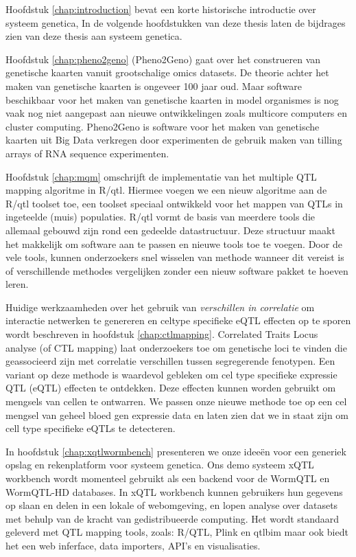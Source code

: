 Hoofdstuk \ref{chap:introduction} bevat een korte historische introductie over systeem genetica, 
In de volgende hoofdstukken van deze thesis laten de bijdrages zien van deze thesis aan systeem genetica.

Hoofdstuk \ref{chap:pheno2geno} (Pheno2Geno) gaat over het construeren van genetische kaarten vanuit grootschalige 
omics datasets. De theorie achter het maken van genetische kaarten is ongeveer 100 jaar oud. Maar 
software beschikbaar voor het maken van genetische kaarten in model organismes is nog 
vaak nog niet aangepast aan nieuwe ontwikkelingen zoals multicore computers en cluster computing. 
Pheno2Geno is software voor het maken van genetische kaarten uit Big Data verkregen door 
experimenten de gebruik maken van tilling arrays of RNA sequence experimenten.

Hoofdstuk \ref{chap:mqm} omschrijft de implementatie van het multiple QTL mapping algoritme 
in R/qtl. Hiermee voegen we een nieuw algoritme aan de R/qtl toolset toe, een 
toolset speciaal ontwikkeld voor het mappen van QTLs in ingeteelde (muis) populaties. R/qtl 
vormt de basis van meerdere tools die allemaal gebouwd zijn rond een gedeelde datastructuur. 
Deze structuur maakt het makkelijk om software aan te passen en nieuwe tools toe te voegen.
Door de vele tools, kunnen onderzoekers snel wisselen van methode wanneer dit vereist is of 
verschillende methodes vergelijken zonder een nieuw software pakket te hoeven leren.

Huidige werkzaamheden over het gebruik van \emph{verschillen in correlatie} om interactie 
netwerken te genereren en celtype specifieke eQTL effecten op te sporen wordt beschreven in 
hoofdstuk \ref{chap:ctlmapping}. Correlated Traits Locus analyse (of CTL mapping) laat 
onderzoekers toe om genetische loci te vinden die geassocieerd zijn met correlatie verschillen 
tussen segregerende fenotypen. Een variant op deze methode is waardevol gebleken om cel 
type specifieke expressie QTL (eQTL) effecten te ontdekken. Deze effecten kunnen worden 
gebruikt om mengsels van cellen te ontwarren. We passen onze nieuwe methode toe op een cel 
mengsel van geheel bloed gen expressie data en laten zien dat we in staat zijn om cell type 
specifieke eQTLs te detecteren.

In hoofdstuk \ref{chap:xqtlwormbench} presenteren we onze idee\"en voor een generiek opslag en rekenplatform 
voor systeem genetica. Ons demo systeem xQTL workbench wordt momenteel gebruikt als een 
backend voor de WormQTL en WormQTL-HD databases. In xQTL workbench kunnen gebruikers hun 
gegevens op slaan en delen in een lokale of webomgeving, en lopen analyse over datasets met 
behulp van de kracht van gedistribueerde computing. Het wordt standaard geleverd met QTL 
mapping tools, zoals: R/QTL, Plink en qtlbim maar ook biedt het een web inferface, data 
importers, API's en visualisaties.

